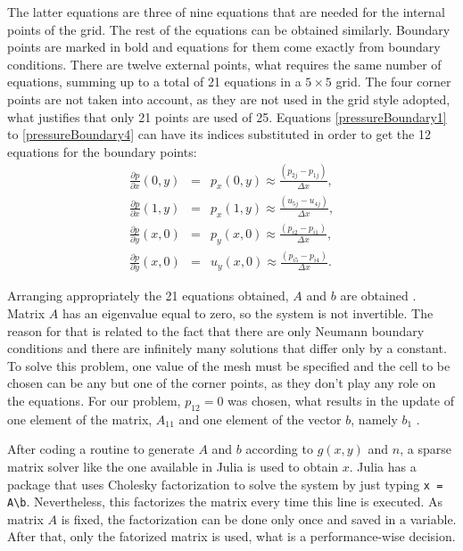 \documentclass[journal]{IEEEtran}
\begin{document}
The latter equations are three of nine equations that are needed for the internal points of the grid. The rest of the equations can be obtained similarly. Boundary points are marked in bold and equations for them come exactly from boundary conditions. There are twelve external points, what requires the same number of equations, summing up to a total of 21 equations in a $5\times 5$ grid. The four corner points are not taken into account, as they are not used in the grid style adopted, what justifies that only 21 points are used of 25. Equations \ref{pressureBoundary1} to \ref{pressureBoundary4} can have its indices substituted in order to get the 12 equations for the boundary points: \begin{eqnarray}
\frac{\partial p}{\partial x}\left(0, y\right) &=& p_x\left(0, y\right)  \approx  \frac{(p_{2j} - p_{1j})}{\Delta x} \label{pressureBoundary1},\\
\frac{\partial p}{\partial x}\left(1, y\right) &=& p_x\left(1, y\right)  \approx  \frac{(u_{5j} - u_{4j})}{\Delta x},\\
\frac{\partial p}{\partial y}\left(x, 0\right) &=& p_y\left(x, 0\right)  \approx \frac{(p_{i2} - p_{i1})}{\Delta x},\\
\frac{\partial p}{\partial y}\left(x, 0\right) &=& u_y\left(x, 0\right)  \approx  \frac{(p_{i5} - p_{i4})}{\Delta x}.\label{pressureBoundary4}
\end{eqnarray}

Arranging appropriately the 21 equations obtained, $A$ and $b$ are obtained \cite{ataias2015}. Matrix $A$ has an eigenvalue equal to zero, so the system is not invertible. The reason for that is related to the fact that there are only Neumann boundary conditions and there are infinitely many solutions that differ only by a constant. To solve this problem, one value of the mesh must be specified and the cell to be chosen can be any but one of the corner points, as they don't play any role on the equations. For our problem, $p_{12} = 0$ was chosen, what results in the update of one element of the matrix, $A_{11}$ and one element of the vector $b$, namely $b_1$ \cite{ataias2015}.

After coding a routine to generate $A$ and $b$ according to $g(x,y)$ and $n$, a sparse matrix solver like the one available in Julia\cite{JuliaProgramming} is used to obtain $x$. Julia has a package that uses Cholesky factorization to solve the system by just typing \texttt{x = A\textbackslash b}. Nevertheless, this factorizes the matrix every time this line is executed. As matrix $A$ is fixed, the factorization can be done only once and saved in a variable. After that, only the fatorized matrix is used, what is a performance-wise decision.
\end{document}
